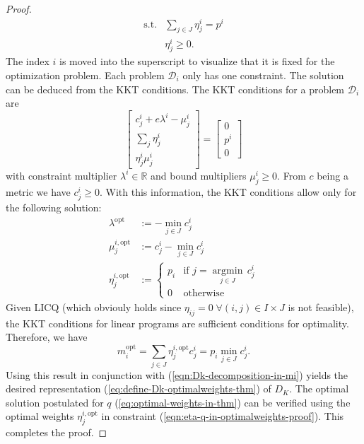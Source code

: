 \begin{proof}
\begin{subequations}
\begin{align}
  \text{s.t.}&\sum_{j\in J}\eta_j^i = p^i\\
  &\eta_j^i\geq 0.
\end{align}
\end{subequations}
The index $i$ is moved into the superscript to visualize that it is fixed for the optimization problem.
Each problem $\mathcal{D}_i$ only has one constraint.
The solution can be deduced from the KKT conditions.
The KKT conditions for a problem $\mathcal{D}_i$ are
\begin{equation}
  \label{eq:D-i-KKT-in-optimalweightsproof}
  \left[
  \begin{array}{c}
  c_j^i + e\lambda^i -\mu_j^i\\
  \sum_{j}\eta_j^i\\
  \eta_j^i\mu_j^i
  \end{array}
  \right]
  = \left[
    \begin{array}{c}
      0\\p^i\\0
    \end{array}
\right]
\end{equation}
with constraint multiplier $\lambda^i\in\mathbb{R}$ and bound multipliers $\mu_j^i\geq 0$.
From $c$ being a metric we have $c_j^i\geq 0$.
With this information, the KKT conditions allow only for the following solution:
\begin{subequations}
\begin{align}
  \label{eq:optimal-eta-optmimalweightsproof}
  \lambda^{\mathrm{opt}} &:= -\min\limits_{j\in J}c_j^i\\
  \mu_j^{i,\mathrm{opt}} &:= c_j^i - \min\limits_{j\in J}c_j^i\\
  \eta_j^{i,\mathrm{opt}} &:= \left\{ \begin{array}{lr}p_i&\text{if }j=\underset{j\in J}{\operatorname{argmin}}\, c_j^i\\0&\text{otherwise}\end{array}\right.
\end{align}
\end{subequations}
Given LICQ (which obviouly holds since $\eta_{ij}=0\;\forall (i,j)\in I\times J$ is not feasible), the KKT conditions for linear programs are sufficient conditions for optimality.
Therefore, we have
\begin{equation}
  m_i^{\mathrm{opt}} = \sum_{j\in J}\eta_j^{i,\mathrm{opt}}c_j^i = p_i\min\limits_{j\in J}c_j^i.
\end{equation}
Using this result in conjunction with (\ref{eqn:Dk-decomposition-in-mi}) yields the desired representation (\ref{eq:define-Dk-optimalweights-thm}) of $D_K$.
The optimal solution postulated for $q$ (\ref{eq:optimal-weights-in-thm}) can be verified using the optimal weights $\eta_j^{i,\mathrm{opt}}$ in constraint (\ref{eqn:eta-q-in-optimalweights-proof}).
This completes the proof.
\end{proof}

